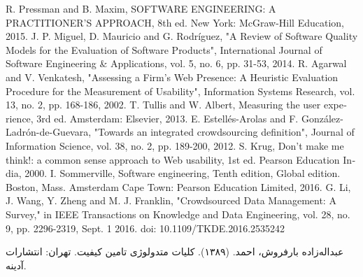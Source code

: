 \documentclass{article}
\theoremstyle{definition}
\begin{document}
\begin{thebibliography}{20}
	\begin{latin}
			R. Pressman and B. Maxim, SOFTWARE ENGINEERING: A PRACTITIONER’S APPROACH, 8th ed. New York: McGraw-Hill Education, 2015.
			J. P. Miguel, D. Mauricio and G. Rodríguez, "A Review of Software Quality Models for the Evaluation of Software Products", International Journal of Software Engineering \& Applications, vol. 5, no. 6, pp. 31-53, 2014.
			R. Agarwal and V. Venkatesh, "Assessing a Firm's Web Presence: A Heuristic Evaluation Procedure for the Measurement of Usability", Information Systems Research, vol. 13, no. 2, pp. 168-186, 2002.
			T. Tullis and W. Albert, Measuring the user experience, 3rd ed. Amsterdam: Elsevier, 2013.
			E. Estellés-Arolas and F. González-Ladrón-de-Guevara, "Towards an integrated crowdsourcing definition", Journal of Information Science, vol. 38, no. 2, pp. 189-200, 2012.
		S. Krug, Don’t make me think!: a common sense approach to Web usability, 1st ed. Pearson Education India, 2000.
		I. Sommerville, Software engineering, Tenth edition, Global edition. Boston, Mass. Amsterdam Cape Town: Pearson Education Limited, 2016.
		G. Li, J. Wang, Y. Zheng and M. J. Franklin, "Crowdsourced Data Management: A Survey," in IEEE Transactions on Knowledge and Data Engineering, vol. 28, no. 9, pp. 2296-2319, Sept. 1 2016.
		doi: 10.1109/TKDE.2016.2535242
	\end{latin}
	عبداله‌زاده بارفروش، احمد. (۱۳۸۹). کلیات متدولوژی تامین کیفیت. تهران: انتشارات آدینه.
\end{thebibliography}

	
\end{document}
